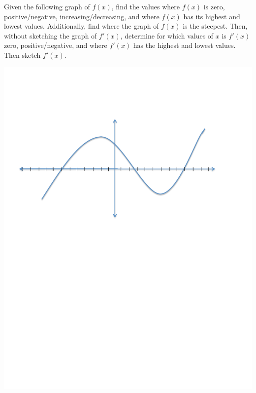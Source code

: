 \documentclass[nooutcomes]{ximera}
\begin{document}
	
	
	
			
			

\begin{problem}
Given the following graph of $f(x)$, find the values where $f(x)$ is zero, positive/negative, increasing/decreasing, and where $f(x)$ has its highest and lowest values.  Additionally, find where the graph of $f(x)$ is the steepest. Then, without sketching the graph of $f'(x)$, determine for which values of $x$ is $f'(x)$ zero, positive/negative, and where $f'(x)$ has the highest and lowest values.  Then sketch $f'(x)$.
	\begin{image}
	\includegraphics[trim= 170 410 250 100]{Figure2.pdf}
	\end{image}


\end{problem}
\end{document}

